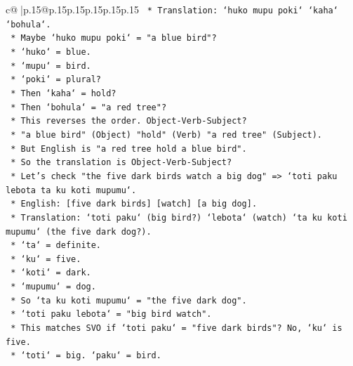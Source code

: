 \documentclass{article}
\begin{document}
{\begin{supertabular}{c@{$\;$}|p{.15\linewidth}@{}p{.15\linewidth}p{.15\linewidth}p{.15\linewidth}p{.15\linewidth}p{.15\linewidth}}
{{{\texttt{                    *   Translation: `huko mupu poki` `kaha` `bohula`.} \\
\texttt{                    *   Maybe `huko mupu poki` = "a blue bird"?} \\
\texttt{                        *   `huko` = blue.} \\
\texttt{                        *   `mupu` = bird.} \\
\texttt{                        *   `poki` = plural?} \\
\texttt{                    *   Then `kaha` = hold?} \\
\texttt{                    *   Then `bohula` = "a red tree"?} \\
\texttt{                    *   This reverses the order. Object{-}Verb{-}Subject?} \\
\texttt{                    *   "a blue bird" (Object) "hold" (Verb) "a red tree" (Subject).} \\
\texttt{                    *   But English is "a red tree hold a blue bird".} \\
\texttt{                    *   So the translation is Object{-}Verb{-}Subject?} \\
\texttt{                    *   Let's check "the five dark birds watch a big dog" => `toti paku lebota ta ku koti mupumu`.} \\
\texttt{                        *   English: {[}five dark birds{]} {[}watch{]} {[}a big dog{]}.} \\
\texttt{                        *   Translation: `toti paku` (big bird?) `lebota` (watch) `ta ku koti mupumu` (the five dark dog?).} \\
\texttt{                        *   `ta` = definite.} \\
\texttt{                        *   `ku` = five.} \\
\texttt{                        *   `koti` = dark.} \\
\texttt{                        *   `mupumu` = dog.} \\
\texttt{                        *   So `ta ku koti mupumu` = "the five dark dog".} \\
\texttt{                        *   `toti paku lebota` = "big bird watch".} \\
\texttt{                        *   This matches SVO if `toti paku` = "five dark birds"? No, `ku` is five.} \\
\texttt{                        *   `toti` = big. `paku` = bird.} \\
}}}
\end{supertabular}}
\end{document}
